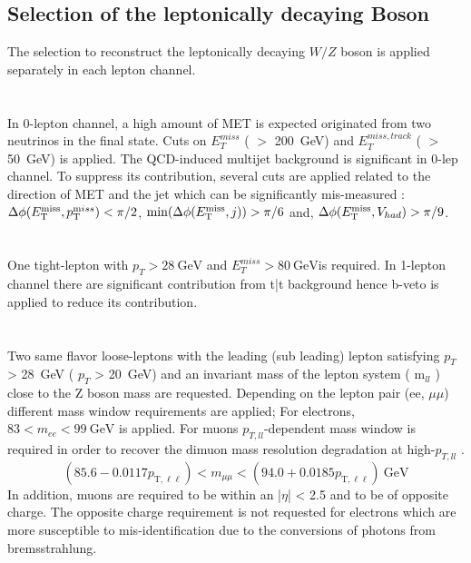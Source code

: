 \subsection{Selection of the leptonically decaying Boson}
The selection to reconstruct the leptonically decaying $W/Z$ boson is applied separately in each lepton channel. \\ \\
\noindent\textbf{}  \\
In 0-lepton channel, a high amount of MET is expected originated from two neutrinos in the final state. Cuts on $E^{miss}_T$ ( $>$ 200~GeV) and $E^{miss,track}_T$ ( $>$ 50~GeV) is applied. The QCD-induced multijet background is significant in 0-lep channel. 
To suppress its contribution, several cuts are applied related to the direction of MET and the jet which can be significantly mis-measured : $\Delta\phi(E_\mathrm{T}^\mathrm{miss},p_{{\textrm T}}^{{\textrm miss}}) < \pi/2$, $\min(\Delta\phi(E_\mathrm{T}^\mathrm{miss},j)) > \pi/6$ and, $\Delta\phi(E_\mathrm{T}^\mathrm{miss}, V_{had}) > \pi/9$. \\ \\ 
\noindent\textbf{}  \\
One tight-lepton with $p_T > 28~\mathrm{GeV}$ and $E^{miss}_T > 80~\mathrm{GeV}$is required. In 1-lepton channel there are significant contribution from t\bar{t} background hence b-veto is applied to reduce its contribution.\\ \\
\noindent\textbf{}  \\
Two same flavor loose-leptons with the leading (sub leading) lepton satisfying $p_T$ > 28~GeV ( $p_T$ > 20~GeV) and an invariant mass of the lepton system ( m$_{ll}$ ) close to the Z boson mass are requested. Depending on the lepton pair (ee, $\mu\mu$) different mass
window requirements are applied; For electrons, $83<m_{ee}<99 ~\mathrm{GeV}$ is applied. For muons $p_{T,ll}$-dependent mass window is required in order to recover the dimuon mass resolution degradation at high-$p_{T,ll}$ \cite{EXOT-2016-29}.
\begin{equation*}
\left(85.6-0.0117 p_{\mathrm{T}, \ell \ell}\right)<m_{\mu \mu}<\left(94.0+0.0185 p_{\mathrm{T}, \ell \ell}\right) ~\mathrm{GeV}
\end{equation*}
In addition, muons are required to be within an |$\eta$| < 2.5 and to be of opposite charge. 
The opposite charge requirement is not requested for electrons which are more susceptible to mis-identification due to the conversions of photons from bremsstrahlung.

